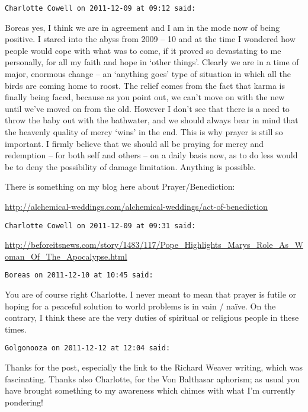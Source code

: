\begin{footnotesize}
\begin{sffamily}
\hfill

\texttt{Charlotte Cowell on 2011-12-09 at 09:12 said: }

Boreas yes, I think we are in agreement and I am in the mode now of being positive. I stared into the abyss from 2009 – 10 and at the time I wondered how people would cope with what was to come, if it proved so devastating to me personally, for all my faith and hope in `other things'. Clearly we are in a time of major, enormous change – an `anything goes' type of situation in which all the birds are coming home to roost. The relief comes from the fact that karma is finally being faced, because as you point out, we can't move on with the new until we've moved on from the old. However I don't see that there is a need to throw the baby out with the bathwater, and we should always bear in mind that the heavenly quality of mercy `wins' in the end. This is why prayer is still so important. I firmly believe that we should all be praying for mercy and redemption – for both self and others – on a daily basis now, as to do less would be to deny the possibility of damage limitation. Anything is possible.

There is something on my blog here about Prayer/Benediction:

\url{http://alchemical-weddings.com/alchemical-weddings/act-of-benediction}


\hfill

\texttt{Charlotte Cowell on 2011-12-09 at 09:31 said: }

\url{http://beforeitsnews.com/story/1483/117/Pope\_Highlights\_Marys\_Role\_As\_Woman\_Of\_The\_Apocalypse.html}


\hfill

\texttt{Boreas on 2011-12-10 at 10:45 said: }

You are of course right Charlotte. I never meant to mean that prayer is futile or hoping for a peaceful solution to world problems is in vain / naïve. On the contrary, I think these are the very duties of spiritual or religious people in these times.


\hfill

\texttt{Golgonooza on 2011-12-12 at 12:04 said: }

Thanks for the post, especially the link to the Richard Weaver writing, which was fascinating. Thanks also Charlotte, for the Von Balthasar aphorism; as usual you have brought something to my awareness which chimes with what I'm currently pondering!


\end{sffamily}\end{footnotesize}
